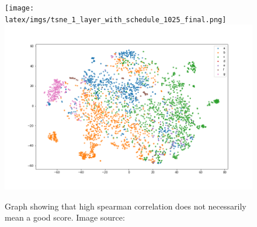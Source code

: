 \begin{figure}[!ht]
  \centering
  \texttt{[image: latex/imgs/tsne\_1\_layer\_with\_schedule\_1025\_final.png]}
  \includegraphics[width=0.4\linewidth]{latex/imgs/tsne_1_layer_with_schedule_1024_minloss.png}
  \caption{Graph showing that high spearman correlation does not necessarily mean a good score. Image source:\cite{spearman}}
\end{figure}

